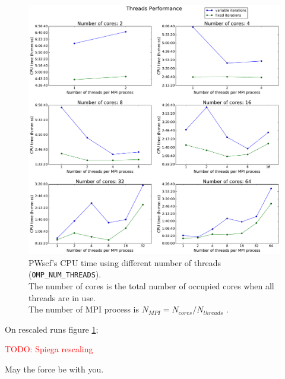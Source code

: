 \documentclass[a4paper,12pt]{article}
\newcommand\mynotes[1]{\begin{flushright}

\textcolor{red}{TODO: #1}\end{flushright}}
\begin{document}
\begin{appendices}
\begin{figure}[hhh!]
	\centerline{\includegraphics[width=\linewidth]{A_threads.pdf}}
	\caption{ PWscf's CPU time using different number of threads (\texttt{OMP\_NUM\_THREADS}).
	\\The number of cores is the total number of occupied cores when all threads are in use.
	\\The number of MPI process is $ N_{MPI} = N_{cores} / N_{threads} $ .}
	\label{fig:A_threads}
\end{figure}


On rescaled runs figure \ref{fig:A_threads};
\mynotes{Spiega rescaling}



\end{appendices}



May the force be with you.
\end{document}

